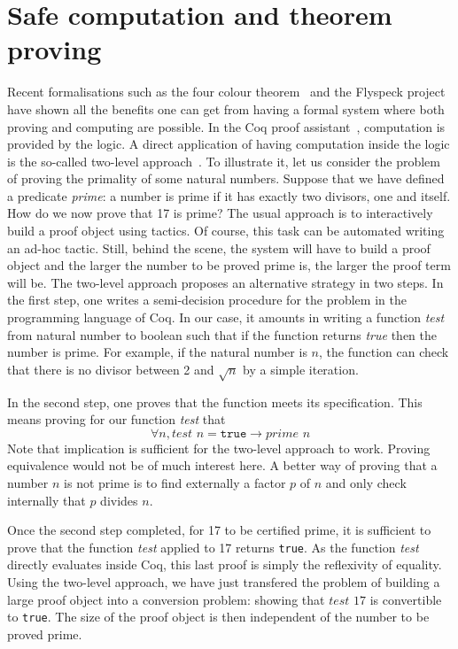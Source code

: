 

\section{Safe computation and theorem proving}

Recent formalisations such as the four colour theorem~\cite{4color} and the Flyspeck project~\cite{kepler} 
have shown all the benefits one can get from having a formal system where both proving and computing are
possible. In the {\sc Coq} proof assistant~\cite{Coq}, computation is
provided by the logic. A direct application of having computation inside the logic is 
the so-called two-level approach~\cite{boutin}. To illustrate it, 
let us consider the problem of proving the primality of some natural 
numbers.
Suppose that we have defined a predicate {\it prime}: a number is prime 
if it has exactly two divisors, one and itself. 
How do we now prove that 17 is prime? The usual approach is to
interactively build a proof object using tactics. Of course, this task can be 
automated writing an ad-hoc tactic. Still, behind the scene, the system 
will have to build a proof object and the larger the number to be proved
prime is, the larger the proof term will be.
The two-level approach proposes an alternative
strategy in two steps. In the first step, one writes a semi-decision procedure
for the problem in the programming language of {\sc Coq}. In our case, it amounts 
in writing a function {\it test} from natural number to boolean such that if the function
returns {\it true} then the number is prime. 
For example, if the natural number
is $n$, the function can check that there is no divisor between 2 and $\sqrt{n}$
by a simple iteration. 

In the second step, one proves that the function meets 
its specification. This means proving for our function {\it test} that
$$
\forall n, \textit{test}\,\, n = \texttt{true} \rightarrow \textit{prime}\,\, n
$$
Note that implication is sufficient for the two-level approach to work.
Proving equivalence would not be of much interest here.
A better way of proving that a number $n$ is not prime is to find externally a factor
$p$ of $n$ and only check internally that $p$ divides $n$.

Once the second step completed, for 17 to be certified prime, it is sufficient to prove that the function
{\it test} applied to 17 returns {\tt true}. As the function {\it test} directly
evaluates inside {\sc Coq}, this last proof is simply the reflexivity of equality.
Using the two-level approach, we have just transfered the problem of building a 
large proof object into a conversion problem: showing that $\textit{test}\,\, 17$ is convertible
to {\tt true}.  The size of the proof object is then independent of the number to be proved
prime. 

